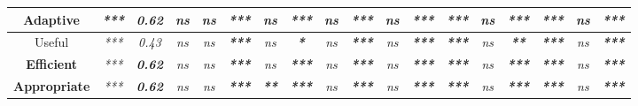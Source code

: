 \begin{sidewaystable}
\begin{tabular}{c|cc|ccccccccccccccc|}
        \multicolumn{1}{|c|}{\textbf{Adaptive}}      & \multicolumn{1}{c|}{\textit{***}} & \textit{\textbf{0.62}} & \multicolumn{1}{c|}{\textit{ns}} & \multicolumn{1}{c|}{\textit{ns}} & \multicolumn{1}{c|}{\textit{\textbf{***}}} & \multicolumn{1}{c|}{\textit{ns}}          & \multicolumn{1}{c|}{\textit{\textbf{***}}} & \multicolumn{1}{c|}{\textit{ns}} & \multicolumn{1}{c|}{\textit{\textbf{***}}} & \multicolumn{1}{c|}{\textit{ns}} & \multicolumn{1}{c|}{\textit{\textbf{***}}} & \multicolumn{1}{c|}{\textit{\textbf{***}}} & \multicolumn{1}{c|}{\textit{ns}}         & \multicolumn{1}{c|}{\textit{\textbf{***}}} & \multicolumn{1}{c|}{\textit{\textbf{***}}} & \multicolumn{1}{c|}{\textit{ns}} & \textit{\textbf{***}} \\ \hline
        \multicolumn{1}{|c|}{Useful}                 & \multicolumn{1}{c|}{\textit{***}} & \textit{0.43}          & \multicolumn{1}{c|}{\textit{ns}} & \multicolumn{1}{c|}{\textit{ns}} & \multicolumn{1}{c|}{\textit{\textbf{***}}} & \multicolumn{1}{c|}{\textit{ns}}          & \multicolumn{1}{c|}{\textit{\textbf{*}}}   & \multicolumn{1}{c|}{\textit{ns}} & \multicolumn{1}{c|}{\textit{\textbf{***}}} & \multicolumn{1}{c|}{\textit{ns}} & \multicolumn{1}{c|}{\textit{\textbf{***}}} & \multicolumn{1}{c|}{\textit{\textbf{***}}} & \multicolumn{1}{c|}{\textit{ns}}         & \multicolumn{1}{c|}{\textit{\textbf{**}}}  & \multicolumn{1}{c|}{\textit{\textbf{***}}} & \multicolumn{1}{c|}{\textit{ns}} & \textit{\textbf{***}} \\ \hline
        \multicolumn{1}{|c|}{\textbf{Efficient}}     & \multicolumn{1}{c|}{\textit{***}} & \textit{\textbf{0.62}} & \multicolumn{1}{c|}{\textit{ns}} & \multicolumn{1}{c|}{\textit{ns}} & \multicolumn{1}{c|}{\textit{\textbf{***}}} & \multicolumn{1}{c|}{\textit{ns}}          & \multicolumn{1}{c|}{\textit{\textbf{***}}} & \multicolumn{1}{c|}{\textit{ns}} & \multicolumn{1}{c|}{\textit{\textbf{***}}} & \multicolumn{1}{c|}{\textit{ns}} & \multicolumn{1}{c|}{\textit{\textbf{***}}} & \multicolumn{1}{c|}{\textit{\textbf{***}}} & \multicolumn{1}{c|}{\textit{ns}}         & \multicolumn{1}{c|}{\textit{\textbf{***}}} & \multicolumn{1}{c|}{\textit{\textbf{***}}} & \multicolumn{1}{c|}{\textit{ns}} & \textit{\textbf{***}} \\ \hline
        \multicolumn{1}{|c|}{\textbf{Appropriate}}   & \multicolumn{1}{c|}{\textit{***}} & \textit{\textbf{0.62}} & \multicolumn{1}{c|}{\textit{ns}} & \multicolumn{1}{c|}{\textit{ns}} & \multicolumn{1}{c|}{\textit{\textbf{***}}} & \multicolumn{1}{c|}{\textit{\textbf{**}}} & \multicolumn{1}{c|}{\textit{\textbf{***}}} & \multicolumn{1}{c|}{\textit{ns}} & \multicolumn{1}{c|}{\textit{\textbf{***}}} & \multicolumn{1}{c|}{\textit{ns}} & \multicolumn{1}{c|}{\textit{\textbf{***}}} & \multicolumn{1}{c|}{\textit{\textbf{***}}} & \multicolumn{1}{c|}{\textit{ns}}         & \multicolumn{1}{c|}{\textit{\textbf{***}}} & \multicolumn{1}{c|}{\textit{\textbf{***}}} & \multicolumn{1}{c|}{\textit{ns}} & \textit{\textbf{***}} \\ \hline

\end{tabular}
\end{sidewaystable}
